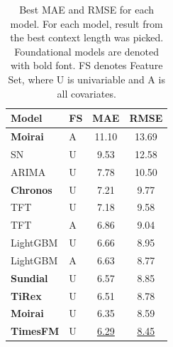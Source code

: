 \begin{table}[H]
\centering
\begin{tabular}{llcc}
\toprule
\textbf{Model} & \textbf{FS} & \textbf{MAE} & \textbf{RMSE} \\
\midrule
\textbf{Moirai} & A & 11.10 & 13.69 \\
SN & U & 9.53 & 12.58 \\
ARIMA & U & 7.78 & 10.50 \\
\textbf{Chronos} & U & 7.21 & 9.77 \\
TFT & U & 7.18 & 9.58 \\
TFT & A & 6.86 & 9.04 \\
LightGBM & U & 6.66 & 8.95 \\
LightGBM & A & 6.63 & 8.77 \\
\textbf{Sundial} & U & 6.57 & 8.85 \\
\textbf{TiRex} & U & 6.51 & 8.78 \\
\textbf{Moirai} & U & 6.35 & 8.59 \\
\textbf{TimesFM} & U & \underline{6.29} & \underline{8.45} \\
\bottomrule
\end{tabular}
\caption{Best MAE and RMSE for each model. For each model, result from the best context length was picked. Foundational models are denoted with bold font. FS denotes Feature Set, where U is univariable and A is all covariates.}
\label{tab:main_result}
\end{table}
